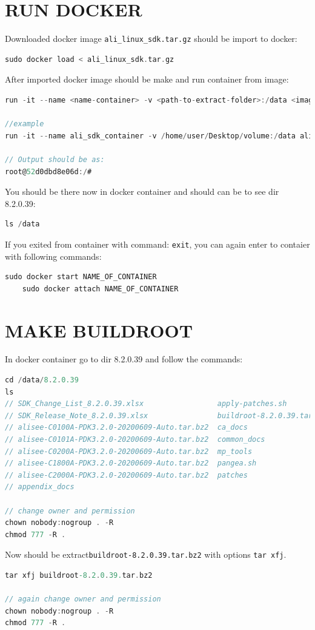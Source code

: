\documentclass[12pt]{report}
\newcommand{\code}[1]{\texttt{#1}} %
\begin{document}
\section{RUN DOCKER}
Downloaded docker image \code{ali{\_}linux{\_}sdk.tar.gz} should be import to docker:
\begin{lstlisting}[language=C, caption= Import docker image. ]
sudo docker load < ali_linux_sdk.tar.gz
\end{lstlisting}

After imported docker image should be make and run container from image:
\begin{lstlisting}[language=C, caption= Run docker container. ]
run -it --name <name-container> -v <path-to-extract-folder>:/data <image>:<version> /bin/bash

//example
run -it --name ali_sdk_container -v /home/user/Desktop/volume:/data ali_linux_sdk:latest /bin/bash

// Output should be as:
root@52d0dbd8e06d:/#

\end{lstlisting}
You should be there now in docker container and should can be to see dir 8.2.0.39:
\begin{lstlisting}[language=C, caption= Run docker container. ]
    ls /data
\end{lstlisting}

If you exited from container with command: \code{exit}, you can again enter to contaier with following commands:
\begin{lstlisting}[language=C, caption= Attach container. ]
    sudo docker start NAME_OF_CONTAINER
    sudo docker attach NAME_OF_CONTAINER
\end{lstlisting}



\section{MAKE BUILDROOT}
In docker container go to dir 8.2.0.39 and follow the commands:
\begin{lstlisting}[language=C]
cd /data/8.2.0.39
ls
// SDK_Change_List_8.2.0.39.xlsx                 apply-patches.sh
// SDK_Release_Note_8.2.0.39.xlsx                buildroot-8.2.0.39.tar.bz2
// alisee-C0100A-PDK3.2.0-20200609-Auto.tar.bz2  ca_docs
// alisee-C0101A-PDK3.2.0-20200609-Auto.tar.bz2  common_docs
// alisee-C0200A-PDK3.2.0-20200609-Auto.tar.bz2  mp_tools
// alisee-C1800A-PDK3.2.0-20200609-Auto.tar.bz2  pangea.sh
// alisee-C2000A-PDK3.2.0-20200609-Auto.tar.bz2  patches
// appendix_docs

// change owner and permission
chown nobody:nogroup . -R
chmod 777 -R .

\end{lstlisting}
Now should be extract\code{buildroot-8.2.0.39.tar.bz2} with options \code{tar xfj}.
\begin{lstlisting}[language=C]
tar xfj buildroot-8.2.0.39.tar.bz2
    
// again change owner and permission
chown nobody:nogroup . -R
chmod 777 -R .
\end{lstlisting}
\end{document}
